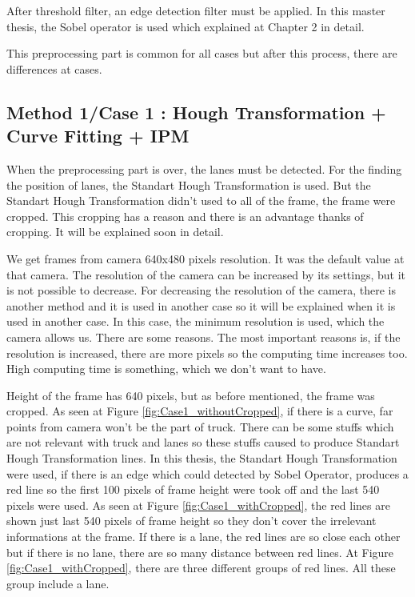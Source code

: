 After threshold filter, an edge detection filter must be applied. In this master thesis, the Sobel operator is used which explained at Chapter 2 in detail.
 
 This preprocessing part is common for all cases but after this process, there are differences at cases.
 
%
\subsection{Method 1/Case 1 : Hough Transformation + Curve Fitting + IPM}\label{sec:Method 1}

When the preprocessing part is over, the lanes must be detected. For the finding the position of lanes, the Standart Hough Transformation is used. But the Standart Hough Transformation didn't used to all of the frame, the frame were cropped. This cropping has a reason and there is an advantage thanks of cropping. It will be explained soon in detail.

We get frames from camera 640x480 pixels resolution. It was the default value at that camera. The resolution of the camera can be increased by its settings, but it is not possible to decrease. For decreasing the resolution of the camera, there is another method and it is used in another case so it will be explained when it is used in another case. In this case, the minimum resolution is used, which the camera allows us. There are some reasons. The most important reasons is, if the resolution is increased, there are more pixels so the computing time increases too. High computing time is something, which we don't want to have.
 
Height of the frame has 640 pixels, but as before mentioned, the frame was cropped. As seen at Figure \ref{fig:Case1_withoutCropped}, if there is a curve, far points from camera won't be the part of truck. There can be some stuffs which are not relevant with truck and lanes so these stuffs caused to produce Standart Hough Transformation lines. In this thesis, the Standart Hough Transformation were used, if there is an edge which could detected by Sobel Operator, produces a red line so the first 100 pixels of frame height were took off and the last 540 pixels were used. As seen at Figure \ref{fig:Case1_withCropped}, the red lines are shown just last 540 pixels of frame height so they don't cover the irrelevant informations at the frame. If there is a lane, the red lines are so close each other but if there is no lane, there are so many distance between red lines. At Figure \ref{fig:Case1_withCropped}, there are three different groups of red lines. All these group include a lane. 

